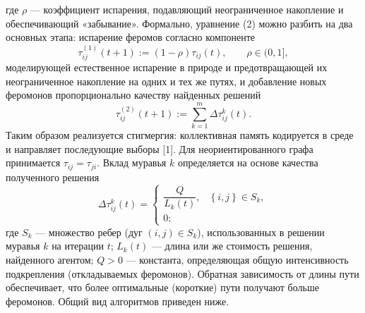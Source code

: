 \documentclass{article}
\newcommand{\1}{\mathds{1}}
\begin{document}
где $\rho$ — коэффициент испарения, подавляющий неограниченное накопление и обеспечивающий «забывание». Формально, уравнение (2) можно разбить на два основных этапа: испарение феромов согласно компоненте 
\begin{equation}
    \tau_{ij}^{(1)}(t+1) := (1-\rho) \tau_{ij}(t), \qquad \rho \in (0,1],
\end{equation}
моделирующей естественное испарение в природе и предотвращающей их неограниченное накопление на одних и тех же путях, и добавление новых феромонов пропорционально качеству найденных решений
\begin{equation}
    \tau_{ij}^{(2)}(t+1) := \sum_{k=1}^m \Delta\tau_{ij}^k(t).
\end{equation}
Таким образом реализуется стигмергия: коллективная память кодируется в среде и направляет последующие выборы [1]. Для неориентированного графа принимается $\tau_{ij} = \tau_{ji}$. Вклад муравья $k$ определяется на основе качества полученного решения
\begin{equation}
    \Delta \tau_{ij}^{k}(t)=
    \begin{cases}
    \dfrac{Q}{L_k(t)}, & \left\{i,j\right\} \in S_k,\\
    0;
    \end{cases}
\end{equation}
где $S_k$ — множество ребер (дуг $(i, j) \in S_k$), использованных в решении муравья $k$ на итерации $t$; $L_k(t)$ — длина или же стоимость решения, найденного агентом; $Q>0$ — константа, определяющая общую интенсивность подкрепления (откладываемых феромонов). Обратная зависимость от длины пути обеспечивает, что более оптимальные (короткие) пути получают больше феромонов. Общий вид алгоритмов приведен ниже.
\end{document}
